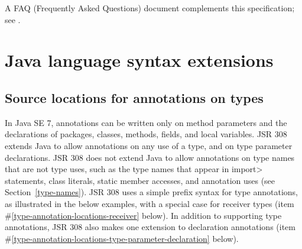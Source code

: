 \documentclass[10pt]{article}
\begin{document}
A FAQ (Frequently Asked Questions) document complements this specification;
see .



\section{Java language syntax extensions\label{syntax}}

\newcommand{\preverbnegspace}{\vspace{-5pt}}

\subsection{Source locations for annotations on types\label{type-annotation-locations}}

In Java SE 7, annotations can be written only on method parameters
and the declarations of packages, classes, methods, fields, and local variables.
JSR 308 extends Java to allow annotations on any use of a type, and
on type parameter declarations.  JSR 308 does not extend Java to allow
annotations on type names that are not type uses, such as the type names
that appear in \<import> statements, class literals, static member accesses,
and annotation uses (see Section~\ref{type-names}).
JSR 308 uses a simple prefix syntax for type annotations, as illustrated in
the below examples, with a special case
for receiver types (item \#\ref{type-annotation-locations-receiver} below).
In addition to supporting type annotations, JSR 308 also makes one
extension to declaration annotations (item
\#\ref{type-annotation-locations-type-parameter-declaration} below).
\end{document}
